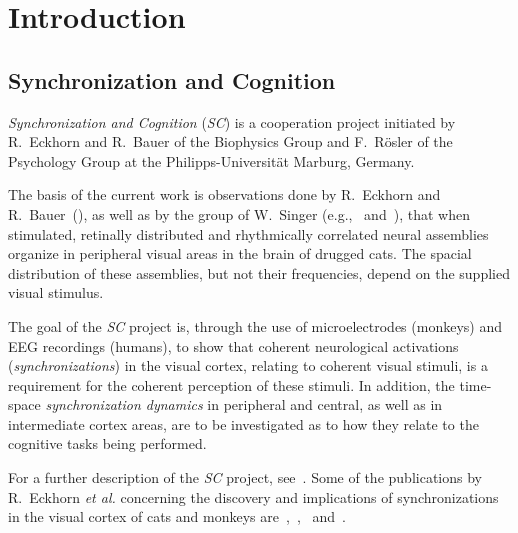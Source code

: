 
\chapter{Introduction}
\label{intro}

\section{Synchronization and Cognition}
\label{intro:synch}

{\em Synchronization and Cognition\/} ({\em SC\/}) is a cooperation
project initiated by R.\ Eckhorn and R.\ Bauer of the Biophysics Group
and F.\ R\"{o}sler of the  Psychology
Group at the Philipps-Universit\"{a}t Marburg, Germany.

The basis of the current work is observations done by R.\ Eckhorn and
R.\ Bauer~(\cite{cat}), as well as by the group of W.\ Singer
(e.g.,~\cite{singer2} and~\cite{singer1}), that when stimulated,
retinally  distributed and
rhythmically correlated neural assemblies organize in peripheral
visual areas in the brain of drugged cats.  The spacial distribution
of these assemblies, but not their frequencies, depend on the supplied
visual stimulus.

The goal of the {\em SC\/} project is, through the use of
microelectrodes (monkeys) and EEG recordings (humans), to show that
coherent neurological activations ({\em synchronizations\/}) in the
visual cortex, relating to coherent visual stimuli, is a requirement
for the coherent perception of these stimuli.  In addition, the
time-space {\em synchronization dynamics\/} in peripheral and central,
as well as in intermediate cortex areas, are to be investigated as to
how they relate to the cognitive tasks being performed.

For a further description of the {\em SC\/} project,
see~\cite{antrag}.  Some of the publications by R.\ Eckhorn {\em et
  al.\/} concerning the discovery and implications of synchronizations
in the visual cortex of cats and monkeys
are~\cite{eckhorn1},~\cite{eckhorn2},~\cite{cat} and~\cite{eckhorn3}.


